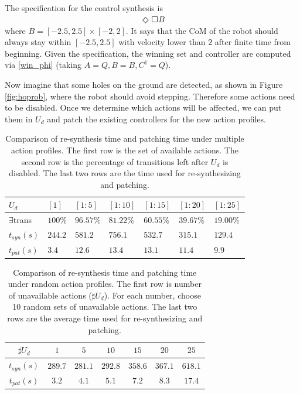 The specification for the control synthesis is 
\begin{align}
\Diamond \Square B
\end{align}
where $ B=[-2.5,2.5]\times[-2,2] $. It says that the CoM of the robot should always stay within $ [-2.5,2.5] $ with velocity lower than $ 2 $ after finite time from beginning. Given the specification, the winning set and controller are computed via \eqref{win_phi} (taking $ A = Q,B=B , C^1 = Q $).

Now imagine that some holes on the ground are detected, as shown in Figure \ref{fig:hoprob}, where the robot should avoid stepping. Therefore some actions need to be disabled. Once we determine which actions will be affected, we can put them in $ U_d $ and patch the existing controllers for the new action profiles.
\begin{table}
	\caption{Comparison of re-synthesis time and patching time under multiple action profiles. The first row is the set of available actions. The second row is the percentage of transitions left after $ U_d $ is disabled. The last two rows are the time used for re-synthesizing and patching.}
	\begin{tabular}{lllllll}
		\hline 
		$ U_d $ & $ [1] $ &$ [1:5] $ & $ [1:10] $ & $ [1:15] $ & $ [1:20] $ & $ [1:25] $ \\ 
		\hline 
		$ \exists $trans & $ 100\% $ & $ 96.57\% $ & $ 81.22\% $ & $ 60.55\% $ & $ 39.67\% $ & $ 19.00\% $\\
		$ t_{syn}(s) $ & $ 244.2 $ & $ 581.2 $ & $ 756.1 $ & $ 532.7 $ & $ 315.1 $ & $ 129.4 $ \\
		$ t_{pat}(s)$ & $ 3.4 $ & $ 12.6 $ & $ 13.4 $ & $ 13.1 $ & $ 11.4 $ & $ 9.9 $ \\ 
		\hline 
	\end{tabular} 
	\label{tab: exper}
\end{table}

\begin{table}
	\caption{Comparison of re-synthesis time and patching time under random action profiles. The first row is number of unavailable actions ($ \sharp U_d $). For each number, choose 10 random sets of unavailable actions. The last two rows are the average time used for re-synthesizing and patching.}
	\begin{tabular}{ccccccc}
		\hline 
		$ \sharp U_d $ & $ 1 $ &$ 5 $ & $ 10 $ & $ 15 $ & $ 20 $ & $ 25 $ \\ 
		\hline 
		$ t_{syn}(s) $ & $ 289.7 $ & $ 281.1 $ & $ 292.8 $ & $ 358.6 $ &  $ 367.1 $ & $ 618.1 $ \\
		$ t_{pat}(s)$ & $ 3.2 $ & $ 4.1 $ & $ 5.1 $ & $ 7.2 $ & $ 8.3 $ & $ 17.4 $ \\ 
		\hline 
	\end{tabular} 
	\label{tab: exper2}
\end{table}

